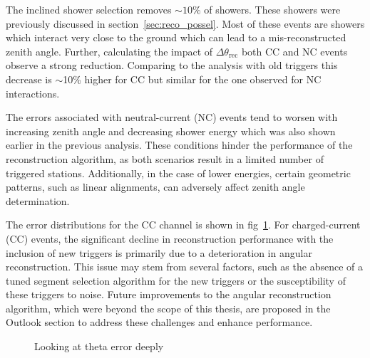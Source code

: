 The inclined shower selection removes $\sim 10\%$ of showers. These showers were previously discussed in section~\ref{sec:reco_possel}. Most of these events are showers which interact very close to the ground which can lead to a mis-reconstructed zenith angle. Further, calculating the impact of $\Delta \theta_{\text{rec}}$ both CC and NC events observe a strong reduction. Comparing to the analysis with old triggers this decrease is $\sim$10\% higher for CC but similar for the one observed for NC interactions. 
 
The errors associated with neutral-current (NC) events tend to worsen with increasing zenith angle and decreasing shower energy which was also shown earlier in the previous analysis. These conditions hinder the performance of the reconstruction algorithm, as both scenarios result in a limited number of triggered stations. Additionally, in the case of lower energies, certain geometric patterns, such as linear alignments, can adversely affect zenith angle determination.

The error distributions for the CC channel is shown in fig~\ref{fig:Theta_err_comp}.
For charged-current (CC) events, the significant decline in reconstruction performance with the inclusion of new triggers is primarily due to a deterioration in angular reconstruction. This issue may stem from several factors, such as the absence of a tuned segment selection algorithm for the new triggers or the susceptibility of these triggers to noise. Future improvements to the angular reconstruction algorithm, which were beyond the scope of this thesis, are proposed in the Outlook section to address these challenges and enhance performance.

\begin{figure}[h!]
  \centering
  \hfill
  \caption{Looking at theta error deeply} 
  \label{fig:Theta_err_comp}
\end{figure}

